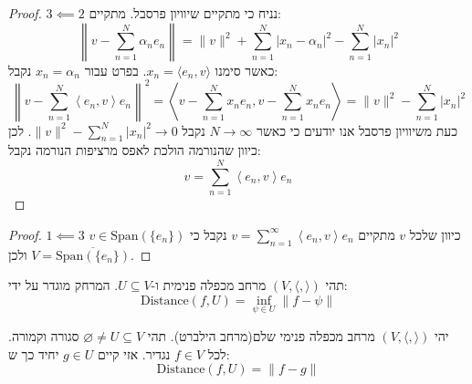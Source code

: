 \documentclass{tstextbook}
\begin{document}
\begin{proof}
\(3\impliedby 2\)
נניח כי מתקיים שיוויון פרסבל. מתקיים:
$$\left\lVert  v-\sum_{n=1}^{N} \alpha_{n}e_{n}  \right\rVert =\|v\|^{2}+\sum_{n=1}^{N}\left|x_{n}-\alpha_{n}\right|^{2}-\sum_{n=1}^{N}\left|x_{n}\right|^{2}$$
כאשר סימנו \(x_{n}=\langle e_{n},v \rangle\). בפרט עבור \(x_{n}=\alpha_{n}\) נקבל:
$$\left\lVert v-\sum_{n=1}^{N}\left\langle e_{n},v\right\rangle e_{n}\right\rVert ^{2}=\left\langle v-\sum_{n=1}^{N}x_{n}e_{n},v-\sum_{n=1}^{N}x_{n}e_{n}\right\rangle=\lVert v \rVert^{2}-\sum_{n=1}^{N}\left|x_{n}\right|^{2}$$
כעת משיוויון פרסבל אנו יודעים כי כאשר \(N\to \infty\) נקבל \(\lVert v \rVert^{2}-\sum_{n=1}^{N}\left|x_{n}\right|^{2}\to 0\). לכן כיוון שהנורמה הולכת לאפס מרציפות הנורמה נקבל:
$$v=\sum_{n=1}^{N}\left\langle e_{n},v\right\rangle e_{n}$$

\end{proof}
\begin{proof}
\(1\impliedby 3\)
כיוון שלכל \(v\) מתקיים \(v=\sum_{n=1}^{\infty}\left\langle e_{n},v\right\rangle e_{n}\) נקבל כי \(v \in\text{Span}\left( \{ e_{n} \} \right)\) ולכן \(V=\overline{\text{Span}\left( \{ e_{n} \} \right)}\).

\end{proof}
\begin{definition}[מרחק]
תהי \((V,\langle , \rangle)\) מרחב מכפלה פנימית ו-\(U\subseteq V\). המרחק מוגדר על ידי:
$$\text{Distance}(f,U)=\inf_{\psi \in U} \lVert f-\psi \rVert $$

\end{definition}
\begin{proposition}
יהי \((V,\langle , \rangle)\) מרחב מכפלה פנימי שלם(מרחב הילברט). תהי \(\varnothing\neq U\subseteq V\) סגורה וקמורה. לכל \(f \in V\) נגדיר. אזי קיים \(g \in U\) יחיד כך ש:
$$\text{Distance}(f,U)=\lVert f-g \rVert $$

\end{proposition}
\end{document}
